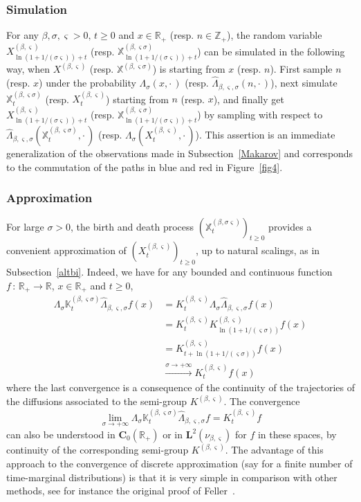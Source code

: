 \documentclass[10pt]{amsart}
\theoremstyle{definition}\newtheorem{defi}[theo]{Definition}\newtheorem{rema}[theo]{Remark}\newtheorem{exam}[theo]{Example}\newtheorem{exem}[theo]{Example}\newtheorem{nota}[theo]{Notation}
\newcommand{\RR}{\mathbb{R}}
\newcommand{\ZZ}{\mathbb{Z}}
\newcommand{\fX}{\mathbb{X}}
\newcommand{\iy}{\infty}
\newcommand{\ri}{\rightarrow}
\newcommand{\wit}{\widehat}
\newcommand{\st}{\,:\,}
\newcommand{\dLs}{{\discret{K}}}
\newcommand{\Ls}{K}
\newcommand{\esL}{\mathbf{L}}
\newcommand{\esC}{\mathbf{C}}
\newcommand{\discret}[1]{\mathds{#1}}
\begin{document}
\subsubsection*{Simulation}
For any $\beta,\sigma,\varsigma>0,\,t\geq 0$ and $x\in \RR_+$ (resp. $n\in\ZZ_+$), the random variable $X^{(\beta,\varsigma)}_{\ln(1+1/(\sigma\varsigma))+t}$ (resp. $\fX^{(\beta,\varsigma\sigma)}_{\ln(1+1/(\sigma\varsigma))+t}$) can be simulated in the following way, when $X^{(\beta,\varsigma)}$ (resp. $\fX^{(\beta,\varsigma\sigma)}$) is starting from $x$ (resp. $n$). First sample $n$ (resp. $x$) under the probability $\Lambda_\sigma(x,{\cdot\,})$ (resp. $\wit\Lambda_{\beta,\varsigma,\sigma}(n,{\cdot\,})$), next simulate $\fX^{(\beta,\varsigma\sigma)}_t$ (resp. $X^{(\beta,\varsigma)}_t$) starting from $n$ (resp. $x$), and finally get $X^{(\beta,\varsigma)}_{\ln(1+1/(\sigma\varsigma))+t}$ (resp. $\fX^{(\beta,\varsigma\sigma)}_{\ln(1+1/(\sigma\varsigma))+t}$) by sampling with respect to $\wit\Lambda_{\beta,\varsigma,\sigma}(\fX^{(\beta,\varsigma\sigma)}_t,{\cdot\,})$ (resp. $\Lambda_\sigma(X^{(\beta,\varsigma)}_t,{\cdot\,})$). This assertion is an immediate generalization of the observations made in Subsection~\ref{Makarov} and corresponds to the commutation of the paths in blue and red in Figure~\ref{fig4}.


\subsubsection*{Approximation}
For large $\sigma>0$, the birth and death process $(\fX_t^{(\beta,\sigma\varsigma)})_{t\geq 0}$ provides a convenient approximation of $(X_t^{(\beta,\varsigma)})_{t\geq 0}$, up to natural scalings, as in Subsection~\ref{altbi}. Indeed, we have for any bounded and continuous function $f\st\RR_+\ri\RR$, $x\in\RR_+$ and $t\geq 0$,
\begin{align*}
\Lambda_\sigma\dLs_t^{(\beta,\varsigma\sigma)}\wit\Lambda_{\beta,\varsigma,\sigma} f(x)&=
\Ls_t^{(\beta,\varsigma)}\Lambda_\sigma\wit\Lambda_{\beta,\varsigma,\sigma} f(x)\\
&= \Ls_t^{(\beta,\varsigma)}\Ls_{\ln(1+1/(\varsigma\sigma))}^{(\beta,\varsigma)}f(x)\\
&=\Ls_{t+\ln(1+1/(\varsigma\sigma))}^{(\beta,\varsigma)}f(x)\\
&\xrightarrow{\sigma\ri +\iy}\Ls_t^{(\beta,\varsigma)}f(x)
\end{align*}
where the last convergence is a consequence of the continuity of the trajectories of the diffusions associated to the semi-group $\Ls^{(\beta,\varsigma)}$. The convergence
\[
\lim_{\sigma\ri +\iy} \Lambda_\sigma\dLs_t^{(\beta,\varsigma\sigma)}\wit\Lambda_{\beta,\varsigma,\sigma}f=\Ls_t^{(\beta,\varsigma)} f
\]
can also be understood in $\esC_0(\RR_+)$ or in $\esL^2(\nu_{\beta,\varsigma})$ for $f$ in these spaces, by continuity of the corresponding semi-group $\Ls^{(\beta,\varsigma)}$. The advantage of this approach to the convergence of discrete approximation (say for a finite number of time-marginal distributions) is that it is very simple in comparison with other methods, see for instance the original proof of Feller~\cite{Feller-Gen}.
\end{document}
